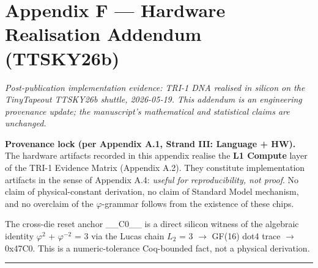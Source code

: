 
\section{Appendix F --- Hardware Realisation Addendum (TTSKY26b)}

\textit{Post-publication implementation evidence: TRI-1 DNA realised in silicon on the TinyTapeout TTSKY26b shuttle, 2026-05-19. This addendum is an engineering provenance update; the manuscript's mathematical and statistical claims are unchanged.}

\textbf{Provenance lock (per Appendix A.1, Strand III: Language + HW).}
The hardware artifacts recorded in this appendix realise the \textbf{L1 Compute} layer of the TRI-1 Evidence Matrix (Appendix A.2). They constitute implementation artifacts in the sense of Appendix A.4: \textit{useful for reproducibility, not proof}. No claim of physical-constant derivation, no claim of Standard Model mechanism, and no overclaim of the $\varphi$-grammar follows from the existence of these chips.

The cross-die reset anchor \_\_C0\_\_ is a direct silicon witness of the algebraic identity $\varphi^{2}$ + $\varphi^{-2}$ = 3 via the Lucas chain $L_{2}$ = 3 $\rightarrow$ GF(16) dot4 trace $\rightarrow$ 0x47C0. This is a numeric-tolerance Coq-bounded fact, not a physical derivation.

\noindent\rule{\textwidth}{0.4pt}